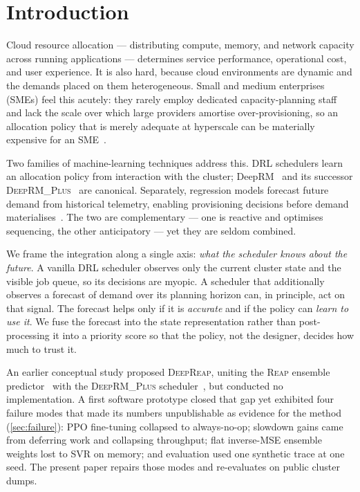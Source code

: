 \documentclass[runningheads]{llncs}
\newcommand{\reap}{\textsc{Reap}}
\newcommand{\deeprm}{\textsc{DeepRM\_Plus}}
\newcommand{\deepreap}{\textsc{DeepReap}}
\begin{document}
\section{Introduction}
Cloud resource allocation --- distributing compute, memory, and network
capacity across running applications --- determines service
performance, operational cost, and user experience. It is also hard,
because cloud environments are dynamic and the demands placed on them
heterogeneous. Small and medium enterprises (SMEs) feel this acutely:
they rarely employ dedicated capacity-planning staff and lack the scale
over which large providers amortise over-provisioning, so an allocation
policy that is merely adequate at hyperscale can be materially
expensive for an SME~\cite{osypanka2022}.

Two families of machine-learning techniques address this. DRL
schedulers learn an allocation policy from interaction with the
cluster; DeepRM~\cite{mao2016} and its successor
\deeprm{}~\cite{guo2021} are canonical. Separately, regression models
forecast future demand from historical telemetry, enabling
provisioning decisions before demand
materialises~\cite{bankole2013,kaur2019}. The two are complementary ---
one is reactive and optimises sequencing, the other anticipatory --- yet
they are seldom combined.

We frame the integration along a single axis: \emph{what the scheduler
knows about the future}. A vanilla DRL scheduler observes only the
current cluster state and the visible job queue, so its decisions are
myopic. A scheduler that additionally observes a forecast of demand over
its planning horizon can, in principle, act on that signal. The
forecast helps only if it is \emph{accurate} and if the policy can
\emph{learn to use it}. We fuse the forecast into the state
representation rather than post-processing it into a priority score
so that the policy, not the designer, decides how much to trust it.

An earlier conceptual study proposed \deepreap{}, uniting the \reap{}
ensemble predictor~\cite{kaur2019} with the \deeprm{}
scheduler~\cite{guo2021}, but conducted no implementation. A first
software prototype closed that gap yet exhibited four failure modes that
made its numbers unpublishable as evidence for the method
(\cref{sec:failure}): PPO fine-tuning collapsed to always-no-op;
slowdown gains came from deferring work and collapsing throughput; flat
inverse-MSE ensemble weights lost to SVR on memory; and evaluation used
one synthetic trace at one seed. The present paper repairs those modes
and re-evaluates on public cluster dumps.
\end{document}
